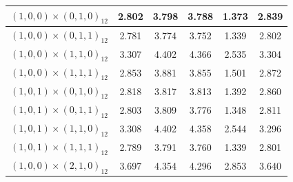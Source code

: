 \begin{enumerate}[label=\alph*.]
\begin{longtable}{|c|c|c|c|c|c|}
        {$(1,0,0) \times (0,1,0)_{12}$} & 2.802 & 3.798 & 3.788 & 1.373 & 2.839 \\ \hline
        {$(1,0,0) \times (0,1,1)_{12}$} & 2.781 & 3.774 & 3.752 & 1.339 & 2.802 \\ \hline
        {$(1,0,0) \times (1,1,0)_{12}$} & 3.307 & 4.402 & 4.366 & 2.535 & 3.304 \\ \hline
        {$(1,0,0) \times (1,1,1)_{12}$} & 2.853 & 3.881 & 3.855 & 1.501 & 2.872 \\ \hline

        {$(1,0,1) \times (0,1,0)_{12}$} & 2.818 & 3.817 & 3.813 & 1.392 & 2.860 \\ \hline
        {$(1,0,1) \times (0,1,1)_{12}$} & 2.803 & 3.809 & 3.776 & 1.348 & 2.811 \\ \hline
        {$(1,0,1) \times (1,1,0)_{12}$} & 3.308 & 4.402 & 4.358 & 2.544 & 3.296 \\ \hline
        {$(1,0,1) \times (1,1,1)_{12}$} & 2.789 & 3.791 & 3.760 & 1.339 & 2.801 \\ \hline

        {$(1,0,0) \times (2,1,0)_{12}$} & 3.697 & 4.354 & 4.296 & 2.853 & 3.640 \\ \hline

    \end{longtable}

\end{enumerate}